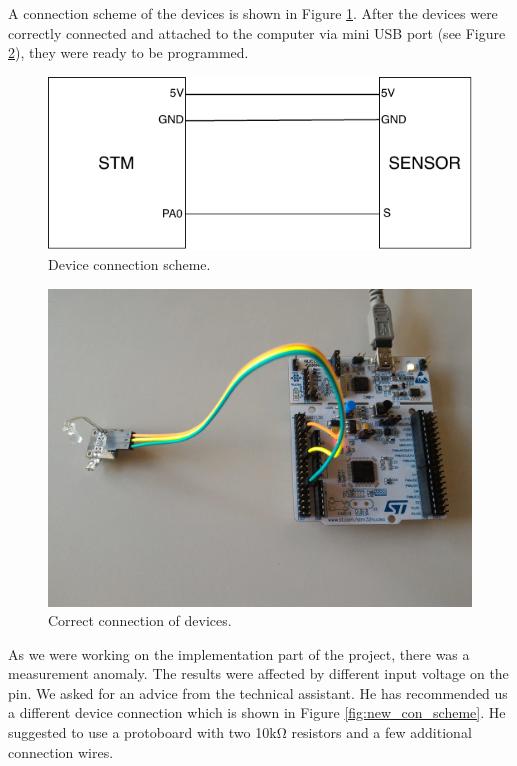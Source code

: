 \documentclass[11pt,a4paper]{article}
\begin{document}
A connection scheme of the devices is shown in Figure \ref{fig:old_con_scheme}. After the devices were correctly connected and attached to the computer via mini USB port (see Figure \ref{fig:connection}), they were ready to be programmed.

\begin{figure}[H]
    \centering
    \includegraphics[scale=1.4]{img/old_con_scheme.pdf}
    \caption{Device connection scheme.}
    \label{fig:old_con_scheme}
\end{figure}

\begin{figure}[H]
    \centering
    \includegraphics[scale=0.1]{img/setup1.jpg}
    \caption{Correct connection of devices.}
    \label{fig:connection}
\end{figure}

As we were working on the implementation part of the project, there was a measurement anomaly. The results were affected by different input voltage on the pin. We asked for an advice from the technical assistant. He has recommended us a different device connection which is shown in Figure \ref{fig:new_con_scheme}. He suggested to use a protoboard with two 10k\si{\ohm} resistors and a few additional connection wires.
\end{document}
